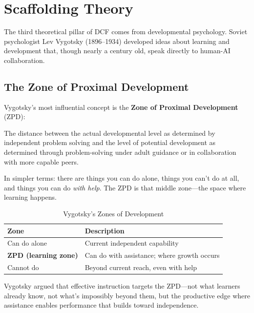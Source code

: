 \chapter{Scaffolding Theory}

The third theoretical pillar of DCF comes from developmental psychology. Soviet psychologist Lev Vygotsky (1896--1934) developed ideas about learning and development \cite{vygotsky1978mind} that, though nearly a century old, speak directly to human-AI collaboration.

\section{The Zone of Proximal Development}

Vygotsky's most influential concept is the \textbf{Zone of Proximal Development} (ZPD):

\begin{quotebox}
The distance between the actual developmental level as determined by independent problem solving and the level of potential development as determined through problem-solving under adult guidance or in collaboration with more capable peers.
\end{quotebox}

In simpler terms: there are things you can do alone, things you can't do at all, and things you can do \emph{with help}. The ZPD is that middle zone---the space where learning happens.

\begin{table}[H]
\centering
\begin{tabular}{lp{8cm}}
\toprule
\textbf{Zone} & \textbf{Description} \\
\midrule
Can do alone & Current independent capability \\
\textbf{ZPD (learning zone)} & Can do with assistance; where growth occurs \\
Cannot do & Beyond current reach, even with help \\
\bottomrule
\end{tabular}
\caption{Vygotsky's Zones of Development}
\end{table}

Vygotsky argued that effective instruction targets the ZPD---not what learners already know, not what's impossibly beyond them, but the productive edge where assistance enables performance that builds toward independence.

